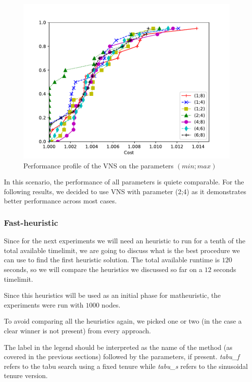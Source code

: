 \documentclass{article}
\begin{document}
\begin{figure}[ht]
        \caption{Performance profile of the VNS on the parameters $\left(min; max\right)$}
        \label{fig:ht_vns}
        \centering
        \includegraphics[width=340pt]{assets/ht_vns.pdf}
\end{figure}

In this scenario, the performance of all parameters is quiete comparable. For the following results, we decided to use
VNS with parameter (2;4) as it demonstrates better performance across most cases.

\clearpage
\subsubsection{Fast-heuristic}
Since for the next experiments we will need an heuristic to run for a tenth of
the total available timelimit, we are going to discuss what is the best
procedure we can use to find the first heuristic solution. The total available
runtime is $120$ seconds, so we will compare the heuristics we discussed so far
on a $12$ seconds timelimit.

Since this heuristics will be used as an initial phase for matheuristic,
the experiments were run with $1000$ nodes.

To avoid comparing all the heuristics again, we picked one or two (in the case
a clear winner is not present) from every approach.

The label in the legend should be interpreted as the name of the method (as
covered in the previous sections) followed by the parameters, if present.
\textit{tabu\_f} refers to the tabu search using a fixed tenure while
\textit{tabu\_s} refers to the sinusoidal tenure version.
\end{document}
